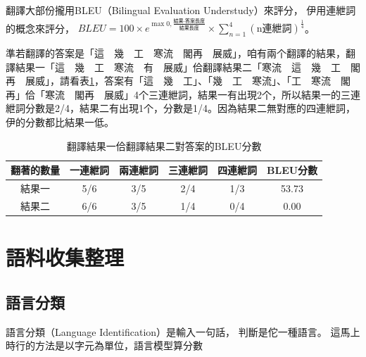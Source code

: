 翻譯大部份攏用BLEU（Bilingual Evaluation Understudy）來評分，
伊用連紲詞的概念來評分，
$BLEU=100\times{e^{\max{0,\frac{\textit{結果-答案長度}}{\textit{結果長度}}}}}\times{\sum_{n=1}^{4}(\textrm{n連紲詞})^{\frac{1}{4}}}$\cite{BLEU程式}。

準若翻譯的答案是「這　幾　工　寒流　閣再　展威」，咱有兩个翻譯的結果，翻譯結果一「這　幾　工　寒流　有　展威」佮翻譯結果二「寒流　這　幾　工　閣再　展威」，請看表\ref{表：範例BLEU分數}，答案有「這　幾　工」、「幾　工　寒流」、「工　寒流　閣再」佮「寒流　閣再　展威」4个三連紲詞，結果一有出現2个，所以結果一的三連紲詞分數是2/4，結果二有出現1个，分數是1/4。因為結果二無對應的四連紲詞，伊的分數都比結果一低。

\begin{table}
\caption{翻譯結果一佮翻譯結果二對答案的BLEU分數}
\label{表：範例BLEU分數}
\centering
\begin{tabular}{|c|cccc|c|}
\hline
翻著的數量 & 一連紲詞 & 兩連紲詞 & 三連紲詞 & 四連紲詞 & BLEU分數\\
\hline
結果一 & 5/6 & 3/5 & 2/4 & 1/3 & 53.73\\
\hline
結果二 & 6/6 & 3/5 & 1/4 & 0/4 & 0.00\\
\hline
\end{tabular}
\end{table}

\section{語料收集整理}
\label{節：語料收集整理}
%
%
%

\subsection{語言分類}
\label{小節：語言分類}
語言分類（Language Identification）是輸入一句話，
判斷是佗一種語言。
這馬上時行的方法是以字元為單位，語言模型算分數\cite{cavnar1994n}

